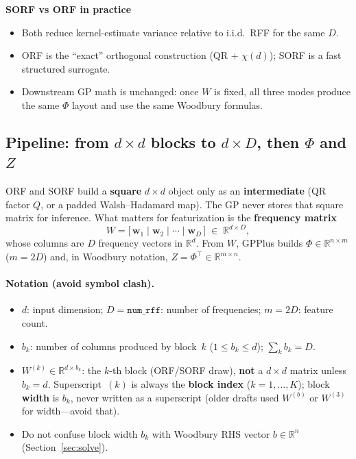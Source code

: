 \documentclass[11pt]{article}
\newcommand{\Ph}{\Phi}
\newcommand{\Zmat}{Z}
\begin{document}
\begin{samebox}
\textbf{SORF vs ORF in practice}
\begin{itemize}
  \item Both reduce kernel-estimate variance relative to i.i.d.\ RFF for the same $D$.
  \item ORF is the ``exact'' orthogonal construction (QR + $\chi(d)$); SORF is a fast structured surrogate.
  \item Downstream GP math is unchanged: once $W$ is fixed, all three modes produce the same $\Ph$ layout
        and use the same Woodbury formulas.
\end{itemize}
\end{samebox}

\subsection{Pipeline: from $d\times d$ blocks to $d\times D$, then $\Ph$ and $\Zmat$}
\label{sec:W-to-Ph-Z}

ORF and SORF build a \textbf{square} $d\times d$ object only as an \textbf{intermediate} (QR factor $Q$,
or a padded Walsh--Hadamard map). The GP never stores that square matrix for inference.
What matters for featurization is the \textbf{frequency matrix}
\begin{equation}
  \label{eq:W-shape}
  \boxed{
  W = \bigl[\,\mathbf w_1 \;\big|\; \mathbf w_2 \;\big|\; \cdots \;\big|\; \mathbf w_D \,\bigr]
  \;\in\; \mathbb{R}^{d \times D},
  }
\end{equation}
whose columns are $D$ frequency vectors in $\mathbb{R}^d$.
From $W$, GPPlus builds $\Ph\in\mathbb{R}^{n\times m}$ ($m=2D$) and, in Woodbury notation, $\Zmat=\Ph^{\top}\in\mathbb{R}^{m\times n}$.

\paragraph{Notation (avoid symbol clash).}
\begin{itemize}[nosep]
  \item $d$: input dimension; $D=\texttt{num\_rff}$: number of frequencies; $m=2D$: feature count.
  \item $b_k$: number of columns produced by block~$k$ ($1\le b_k\le d$); $\sum_k b_k = D$.
  \item $W^{(k)}\in\mathbb{R}^{d\times b_k}$: the $k$-th block (ORF/SORF draw), \textbf{not} a $d\times d$ matrix unless $b_k=d$.
        Superscript~$(k)$ is always the \textbf{block index} ($k=1,\ldots,K$); block \textbf{width} is $b_k$, never written as a superscript
        (older drafts used $W^{(b)}$ or $W^{(3)}$ for width---avoid that).
  \item Do not confuse block width $b_k$ with Woodbury RHS vector $b\in\mathbb{R}^n$ (Section~\ref{sec:solve}).
\end{itemize}
\end{document}
